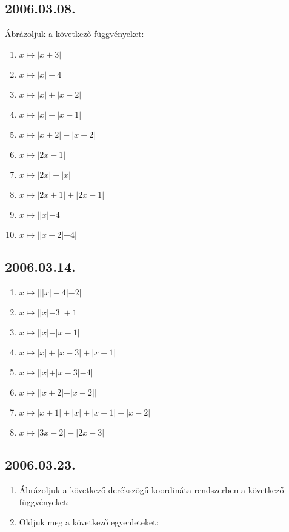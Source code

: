 \subsection*{2006.03.08.}
Ábrázoljuk a következő függvényeket:
\begin{enumerate}
\item $x \mapsto |x+3|$
\item $x \mapsto |x|-4$
\item $x \mapsto |x|+|x-2|$
\item $x \mapsto |x|-|x-1|$
\item $x \mapsto |x+2|-|x-2|$
\item $x \mapsto |2x-1|$
\item $x \mapsto |2x|-|x|$
\item $x \mapsto |2x+1|+|2x-1|$
\item $x \mapsto ||x|-4|$
\item $x \mapsto ||x-2|-4|$
\end{enumerate}

\subsection*{2006.03.14.}
\begin{enumerate}
\item $x \mapsto |||x|-4|-2|$
\item $x \mapsto||x|-3|+1$
\item $x \mapsto ||x|-|x-1||$
\item $x \mapsto |x|+|x-3|+|x+1|$
\item $x \mapsto ||x|+|x-3|-4|$
\item $x \mapsto ||x+2|-|x-2||$
\item $x \mapsto |x+1|+|x|+|x-1|+|x-2|$
\item $x \mapsto |3x-2|-|2x-3|$
\end{enumerate}

\subsection*{2006.03.23.}
\begin{enumerate}
\item Ábrázoljuk a következő derékszögű koordináta-rendszerben a következő függvényeket:
\item Oldjuk meg a következő egyenleteket:
\end{enumerate}

